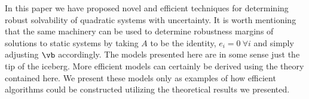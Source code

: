 In this paper we have proposed novel and efficient techniques for determining robust solvability of quadratic systems with uncertainty. 
It is worth mentioning that the same machinery can be used to determine robustness margins of solutions to static systems by taking $A$ to be the identity, $e_i=0 \ \forall i$ and simply adjusting $\vb$ accordingly. 
The models presented here are in some sense just the tip of the iceberg. 
More efficient models can certainly be derived using the theory contained here. 
We present these models only as examples of how efficient algorithms could be constructed utilizing the theoretical results we presented. 
